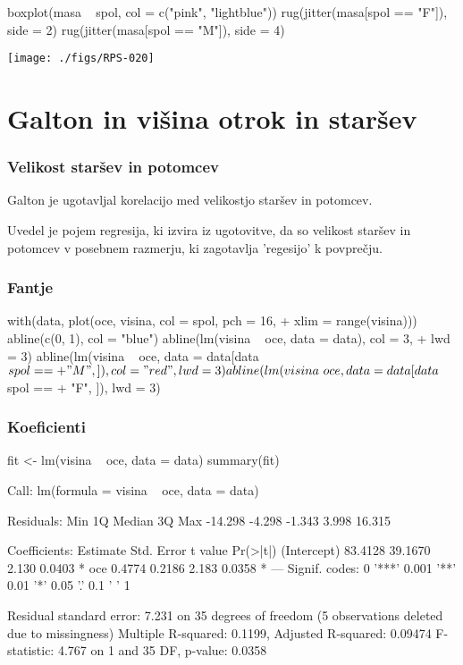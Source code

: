 \begin{Schunk}
\begin{Sinput}
  boxplot(masa ~ spol, col = c("pink", "lightblue"))
  rug(jitter(masa[spol == "F"]), side = 2)
  rug(jitter(masa[spol == "M"]), side = 4)
\end{Sinput}
\end{Schunk}
\texttt{[image: ./figs/RPS-020]}


\clearpage
\section{Galton in višina otrok in staršev}
\begin{frame}[fragile]
\frametitle{Velikost staršev in potomcev}
Galton je ugotavljal korelacijo med velikostjo staršev in potomcev.

Uvedel je pojem regresija, ki izvira iz ugotovitve, da so velikost staršev in potomcev v posebnem razmerju, ki zagotavlja 'regesijo' k povprečju.
\end{frame}

\begin{frame}[fragile]
\frametitle{Fantje}
\begin{Schunk}
\begin{Sinput}
  with(data, plot(oce, visina, col = spol, pch = 16, 
+     xlim = range(visina)))
  abline(c(0, 1), col = "blue")
  abline(lm(visina ~ oce, data = data), col = 3, 
+     lwd = 3)
  abline(lm(visina ~ oce, data = data[data$spol == 
+     "M", ]), col = "red", lwd = 3)
  abline(lm(visina ~ oce, data = data[data$spol == 
+     "F", ]), lwd = 3)
\end{Sinput}
\end{Schunk}
\end{frame}

\begin{frame}[fragile]
\frametitle{Koeficienti}
\begin{Schunk}
\begin{Sinput}
  fit <- lm(visina ~ oce, data = data)
  summary(fit)
\end{Sinput}
\begin{Soutput}
Call:
lm(formula = visina ~ oce, data = data)

Residuals:
    Min      1Q  Median      3Q     Max 
-14.298  -4.298  -1.343   3.998  16.315 

Coefficients:
            Estimate Std. Error t value Pr(>|t|)  
(Intercept)  83.4128    39.1670   2.130   0.0403 *
oce           0.4774     0.2186   2.183   0.0358 *
---
Signif. codes:  0 '***' 0.001 '**' 0.01 '*' 0.05 '.' 0.1 ' ' 1 

Residual standard error: 7.231 on 35 degrees of freedom
  (5 observations deleted due to missingness)
Multiple R-squared: 0.1199,	Adjusted R-squared: 0.09474 
F-statistic: 4.767 on 1 and 35 DF,  p-value: 0.0358 
\end{Soutput}
\end{Schunk}
\end{frame}

